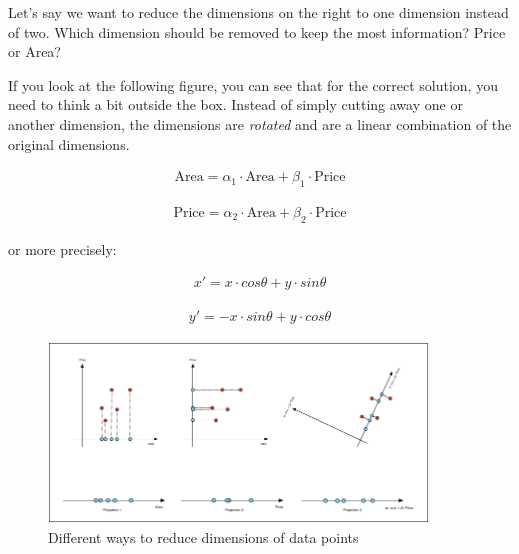 \documentclass[11pt]{article}
\begin{document}
Let's say we want to reduce the dimensions on the right to one dimension instead of two. Which dimension should be removed to keep the most information? Price or Area?

\vspace{10px}

If you look at the following figure, you can see that for the correct solution, you need to think a bit outside the box. Instead of simply cutting away one or another dimension, the dimensions are \textit{rotated} and are a linear combination of the original dimensions.

\vspace{-20px}

\begin{align*}
    \text{Area} = \alpha_1 \cdot \text{Area} + \beta_1 \cdot \text{Price}
\end{align*}

\vspace{-30px}

\begin{align*}
    \text{Price} = \alpha_2 \cdot \text{Area} + \beta_2 \cdot \text{Price}
\end{align*}

or more precisely:

\noindent\begin{minipage}{.5\linewidth}
    \begin{align*}
        x' = x \cdot cos \theta + y \cdot sin \theta
    \end{align*}
\end{minipage}%
\noindent\begin{minipage}{.5\linewidth}
    \begin{align*}
        y' = -x \cdot sin \theta + y \cdot cos \theta
    \end{align*}
\end{minipage}

\begin{figure}[htb!]
    \centering
    \includegraphics[keepaspectratio,width=0.9\textwidth]{data_projections}
    \caption{Different ways to reduce dimensions of data points}
\end{figure}
\end{document}
